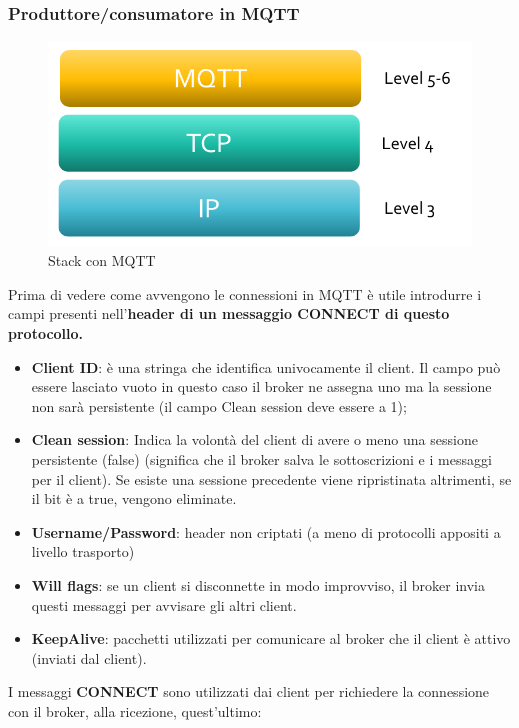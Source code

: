 \documentclass[12pt]{article}
\begin{document}
    		\subsubsection{Produttore/consumatore in MQTT}
    			\begin{figure}[h!]
    				\centering
    				\includegraphics[scale=0.3]{img/mqttstack.png}
    				\caption{Stack con MQTT}
    			\end{figure}
    			Prima di vedere come avvengono le connessioni in MQTT è utile introdurre i campi presenti nell'\textbf{header di un messaggio CONNECT di questo protocollo.}
    			\begin{itemize}
    				\item \textbf{Client ID}: è una stringa che identifica univocamente il client. Il campo può essere lasciato vuoto in questo caso il broker ne assegna uno ma la sessione non sarà persistente (il campo Clean session deve essere a 1); 
    				\item \textbf{Clean session}: Indica la volontà del client di avere o meno una sessione persistente (false) (significa che il broker salva le sottoscrizioni e i messaggi per il client). Se esiste una sessione precedente viene ripristinata altrimenti, se il bit è a true, vengono eliminate. 
    				\item \textbf{Username/Password}: header non criptati (a meno di protocolli appositi a livello trasporto)
    				\item \textbf{Will flags}: se un client si disconnette in modo improvviso, il broker invia questi messaggi per avvisare gli altri client.
    				\item \textbf{KeepAlive}: pacchetti utilizzati per comunicare al broker che il client è attivo (inviati dal client).
    			\end{itemize}	
    			I messaggi \textbf{CONNECT} sono utilizzati dai client per richiedere la connessione con il broker, alla ricezione, quest'ultimo:
\end{document}
